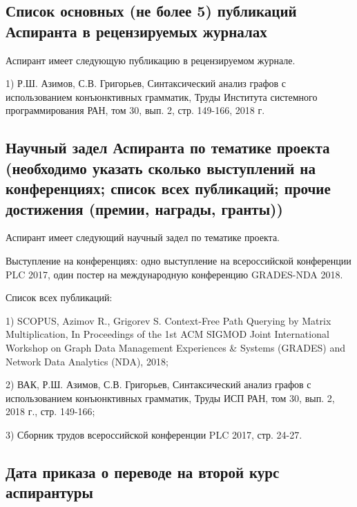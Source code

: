 \documentclass[12pt]{article}  %
\theoremstyle{remark}
\begin{document}
\subsection{Список основных (не более 5) публикаций Аспиранта в рецензируемых журналах}
Аспирант имеет следующую публикацию в рецензируемом журнале.

1) Р.Ш. Азимов, С.В. Григорьев, Синтаксический анализ графов с использованием конъюнктивных грамматик, Труды Института системного программирования РАН, том 30, вып. 2, стр. 149-166, 2018 г.
\subsection{Научный задел Аспиранта по тематике проекта (необходимо указать сколько выступлений на конференциях; список всех публикаций; прочие достижения (премии, награды, гранты))}
Аспирант имеет следующий научный задел по тематике проекта.

Выступление на конференциях: одно выступление на всероссийской конференции PLC 2017, один постер на международную конференцию GRADES-NDA 2018.

Список всех публикаций:

1) SCOPUS, Azimov R., Grigorev S. Context-Free Path Querying by Matrix Multiplication, In Proceedings of the 1st ACM SIGMOD Joint International Workshop on Graph Data Management Experiences \& Systems (GRADES) and Network Data Analytics (NDA), 2018;

2) ВАК, Р.Ш. Азимов, С.В. Григорьев, Синтаксический анализ графов с использованием конъюнктивных грамматик, Труды ИСП РАН, том 30, вып. 2, 2018 г., стр. 149-166;

3) Сборник трудов всероссийской конференции PLC 2017, стр. 24-27.

\subsection{Дата приказа о переводе на второй курс аспирантуры}
\end{document}
